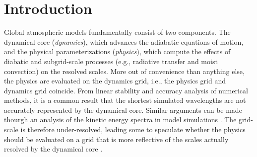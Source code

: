 \documentclass{agujournal}
\begin{document}


\section{Introduction}

Global atmospheric models fundamentally consist of two components. The dynamical core ({\em{dynamics}}), which advances the adiabatic equations of motion, and the physical parameterizations ({\em{physics}}), which compute the effects of diabatic and subgrid-scale processes (e.g., radiative transfer and moist convection) on the resolved scales. More out of convenience than anything else, the physics are evaluated on the dynamics grid, i.e., the physics grid and dynamics grid coincide. From linear stability and accuracy analysis of numerical methods, it is a common result that the shortest simulated wavelengths are not accurately represented by the dynamical core. Similar arguments can be made thourgh an analysis of the kinetic energy spectra in model simulations \citep{S2011LNCSE}. The grid-scale is therefore under-resolved, leading some to speculate whether the physics should be evaluated on a grid that is more reflective of the scales actually resolved by the dynamical core \citep{LH1997MWR,W2007JMSJ,S2011LNCSE}.
\end{document}
